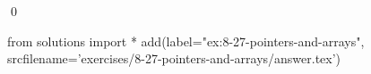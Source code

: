 
\begin{ex}
  \label{ex:8-27-pointers-and-arrays}
  
  \qed
\end{ex}
\begin{python0}
from solutions import *
add(label="ex:8-27-pointers-and-arrays",
    srcfilename='exercises/8-27-pointers-and-arrays/answer.tex')
\end{python0}
